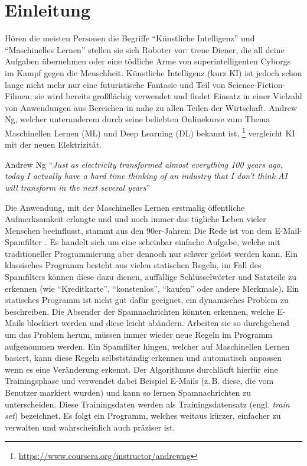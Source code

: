 \chapter{Einleitung}
Hören die meisten Personen die Begriffe \enquote{Künstliche Intelligenz}
und \enquote{Maschinelles Lernen} stellen sie sich Roboter vor:
treue Diener, die all deine Aufgaben übernehmen oder eine tödliche Arme
von superintelligenten Cyborgs im Kampf gegen die Menschheit.
Künstliche Intelligenz (kurz KI) ist jedoch schon lange nicht mehr nur eine futuristische
Fantasie und Teil von Science-Fiction-Filmen; sie wird bereits großflächig
verwendet und findet Einsatz in einer Vielzahl von Anwendungen aus Bereichen
in nahe zu allen Teilen der Wirtschaft. Andrew Ng,
welcher unteranderem durch seine beliebten Onlinekurse zum Thema
Maschinellen Lernen (ML) und Deep Learning (DL)
bekannt ist,
\footnote{\url{https://www.coursera.org/instructor/andrewng}}
vergleicht KI mit der neuen Elektrizität.
\begin{aquote}{Andrew Ng \parencite{online:ai-andrew-ng}}
  \enquote{\textit{Just as electricity transformed almost everything 100 years ago,
      today I actually have a hard time thinking
      of an industry that I don’t think AI will
      transform in the next several years}}
\end{aquote}
Die Anwendung, mit der Maschinelles Lernen erstmalig öffentliche Aufmerksamkeit
erlangte und und noch immer das tägliche Leben vieler Menschen beeinflusst,
stammt aus den 90er-Jahren:
Die Rede ist von dem E-Mail-Spamfilter \parencite[1]{book:hands-on-ml}.
Es handelt sich um eine scheinbar einfache Aufgabe, welche
mit traditioneller Programmierung aber dennoch nur schwer gelöst werden kann.
Ein klassisches Programm besteht aus vielen statischen Regeln,
im Fall des Spamfilters können diese dazu dienen, auffällige Schlüsselwörter und
Satzteile zu erkennen (wie \enquote{Kreditkarte}, \enquote{konstenlos}, \enquote{kaufen} oder
andere Merkmale).
Ein statisches Programm ist nicht gut dafür geeignet, ein dynamisches Problem
zu beschreiben. Die Absender der Spamnachrichten könnten erkennen, welche E-Mails blockiert werden
und diese leicht abändern. Arbeiten sie so durchgehend um das Problem herum,
müssen immer wieder neue Regeln im Programm aufgenommen werden. Ein Spamfilter hingen,
welcher auf Maschinellen Lernen basiert, kann diese Regeln
selbstständig erkennen und automatisch anpassen wenn es eine Veränderung erkennt.
Der Algorithmus durchläuft hierfür eine Trainingsphase und verwendet dabei
Beispiel E-Mails (z.\,B. diese, die vom Benutzer markiert wurden)
und kann so lernen Spamnachrichten zu unterscheiden.
Diese Trainingsdaten werden als Trainingsdatensatz (engl. \textit{train set})
bezeichnet.
Es folgt ein Programm, welches weitaus kürzer,
einfacher zu verwalten und wahrscheinlich auch präziser ist.

